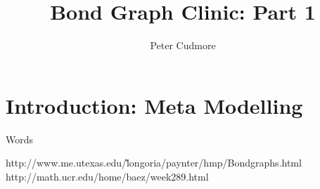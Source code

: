\documentclass[11pt, a4paper]{amsart}
\title{Bond Graph Clinic: Part 1}
\author{Peter Cudmore}
\begin{document}
	\maketitle

\section{Introduction: Meta Modelling}
Words



\begin{thebibliography}{2}
http://www.me.utexas.edu/\~longoria/paynter/hmp/Bondgraphs.html
 http://math.ucr.edu/home/baez/week289.html
\end{thebibliography}
	
\end{document}
